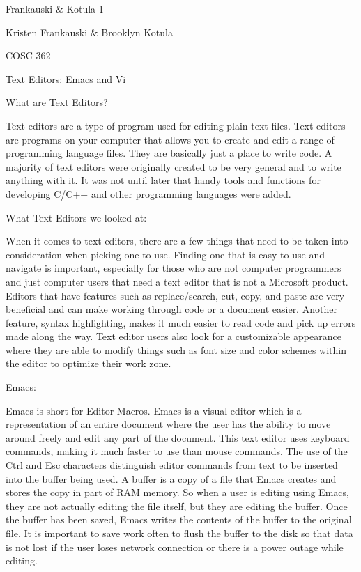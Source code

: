 \documentclass{article} %
\begin{document}


\noindent Frankauski \& Kotula 1

\noindent Kristen Frankauski \& Brooklyn Kotula

\noindent COSC 362 

\noindent 

\noindent Text Editors:  Emacs and Vi

\noindent 

\noindent What are Text Editors?

\noindent 

\noindent Text editors are a type of program used for editing plain text files. Text editors are programs on your computer that allows you to create and edit a range of programming language files. They are basically just  a place to write code. A majority of text editors were originally created to be very general and to write anything with it. It was not until later that handy tools and functions for developing C/C++ and other programming languages were added.

\noindent 

\noindent What Text Editors we looked at:

\noindent 

\noindent When it comes to text editors, there are a few things that need to be taken into consideration when picking one to use. Finding one that is easy to use and navigate is important, especially for those who are not computer programmers and just computer users that need a text editor that is not a Microsoft product. Editors that have features such as replace/search, cut, copy, and paste are very beneficial and can make working through code or a document easier. Another feature, syntax highlighting, makes it much easier to read code and pick up errors made along the way. Text editor users also look for a customizable appearance where they are able to modify things such as font size and color schemes within the editor to optimize their work zone.

\noindent 

\noindent Emacs:

\noindent 

\noindent Emacs is short for Editor Macros. Emacs is a visual editor which is a representation of an entire document where the user has the ability to move around freely and edit any part of the document. This text editor uses keyboard commands, making it much faster to use than mouse commands. The use of the Ctrl and Esc characters distinguish editor commands from text to be inserted into the buffer being used. A buffer is a copy of a file that Emacs creates and stores the copy in part of RAM memory. So when a user is editing using Emacs, they are not actually editing the file itself, but they are editing the buffer. Once the buffer has been saved, Emacs writes the contents of the buffer to the original file. It is important to save work often to flush the buffer to the disk so that data is not lost if the user loses network connection or there is a power outage while editing.
\end{document}
